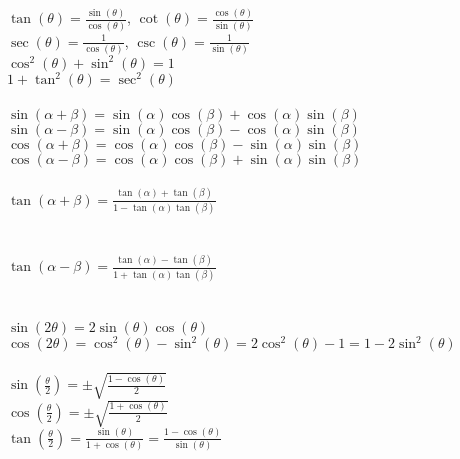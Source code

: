 \documentclass{ximera}
\begin{document}
$\tan(\theta)=\frac{\sin(\theta)}{\cos(\theta)}$, \text{          }$\cot(\theta)=\frac{\cos(\theta)}{\sin(\theta)}$\\

$\sec(\theta)=\frac{1}{\cos(\theta)}$, \text{           }$\csc(\theta)=\frac{1}{\sin(\theta)}$\\

$\cos^2(\theta)+\sin^2(\theta)=1$\\

$1+\tan^2(\theta)=\sec^2(\theta)$\\\\



$\sin(\alpha+\beta)=\sin(\alpha)\cos(\beta)+\cos(\alpha)\sin(\beta)$\\

$\sin(\alpha-\beta)=\sin(\alpha)\cos(\beta)-\cos(\alpha)\sin(\beta)$\\

$\cos(\alpha+\beta)=\cos(\alpha)\cos(\beta)-\sin(\alpha)\sin(\beta)$\\

$\cos(\alpha-\beta)=\cos(\alpha)\cos(\beta)+\sin(\alpha)\sin(\beta)$\\\\




$\tan(\alpha+\beta)=\frac{\tan(\alpha)+\tan(\beta)}{1-\tan(\alpha)\tan(\beta)}$\\\\\\
$\tan(\alpha-\beta)=\frac{\tan(\alpha)-\tan(\beta)}{1+\tan(\alpha)\tan(\beta)}$\\\\\\



$\sin(2\theta)=2\sin(\theta)\cos(\theta)$\\

$\cos(2\theta)=\cos^2(\theta)-\sin^2(\theta) = 2\cos^2(\theta)-1 = 1-2\sin^2(\theta)$\\\\

$\sin\left(\frac{\theta}{2}\right)=\pm\sqrt{\frac{1-\cos(\theta)}{2}}$\\

$\cos\left(\frac{\theta}{2}\right)=\pm\sqrt{\frac{1+\cos(\theta)}{2}}$\\

$\tan\left(\frac{\theta}{2}\right)=\frac{\sin(\theta)}{1+\cos(\theta)}=\frac{1-\cos(\theta)}{\sin(\theta)}$
\end{document}
